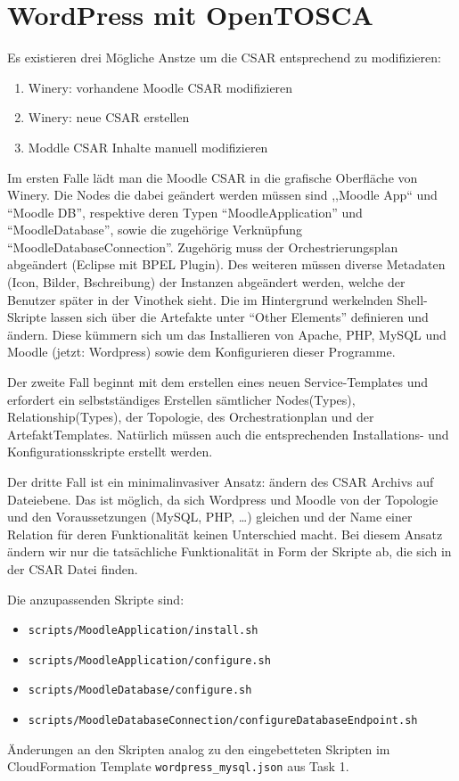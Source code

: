 \section{WordPress mit OpenTOSCA}

Es existieren drei Mögliche Anstze um die CSAR entsprechend zu modifizieren:
\begin{enumerate}
    \item Winery: vorhandene Moodle CSAR modifizieren
    \item Winery: neue CSAR erstellen
    \item Moddle CSAR Inhalte manuell modifizieren
\end{enumerate}

Im ersten Falle lädt man die Moodle CSAR in die grafische Oberfläche von Winery.
Die Nodes die dabei geändert werden müssen sind ,,Moodle App`` und \enquote{Moodle DB}, respektive deren Typen \enquote{MoodleApplication} und \enquote{MoodleDatabase}, sowie die zugehörige Verknüpfung \enquote{MoodleDatabaseConnection}.
Zugehörig muss der Orchestrierungsplan abgeändert (Eclipse mit BPEL Plugin).
Des weiteren müssen diverse Metadaten (Icon, Bilder, Bschreibung) der Instanzen abgeändert werden, welche der Benutzer später in der Vinothek sieht.
Die im Hintergrund werkelnden Shell-Skripte lassen sich über die Artefakte unter \enquote{Other Elements} definieren und ändern. Diese kümmern sich um das Installieren von Apache, PHP, MySQL und Moodle (jetzt: Wordpress) sowie dem Konfigurieren dieser Programme.

Der zweite Fall beginnt mit dem erstellen eines neuen Service-Templates und erfordert ein selbstständiges Erstellen sämtlicher Nodes(Types), Relationship(Types), der Topologie, des Orchestrationplan und der ArtefaktTemplates.
Natürlich müssen auch die entsprechenden Installations- und Konfigurationsskripte erstellt werden.

Der dritte Fall ist ein minimalinvasiver Ansatz: ändern des CSAR Archivs auf Dateiebene.
Das ist möglich, da sich Wordpress und Moodle von der Topologie und den Voraussetzungen (MySQL, PHP, \ldots) gleichen und der Name einer Relation für deren Funktionalität keinen Unterschied macht.
Bei diesem Ansatz ändern wir nur die tatsächliche Funktionalität in Form der Skripte ab, die sich in der CSAR Datei finden.

Die anzupassenden Skripte sind:
\begin{itemize}
    \item \texttt{scripts/MoodleApplication/install.sh}
    \item \texttt{scripts/MoodleApplication/configure.sh}
    \item \texttt{scripts/MoodleDatabase/configure.sh}
    \item \texttt{scripts/MoodleDatabaseConnection/configureDatabaseEndpoint.sh}
\end{itemize}
Änderungen an den Skripten analog zu den eingebetteten Skripten im CloudFormation Template \texttt{wordpress\_mysql.json} aus Task 1.

